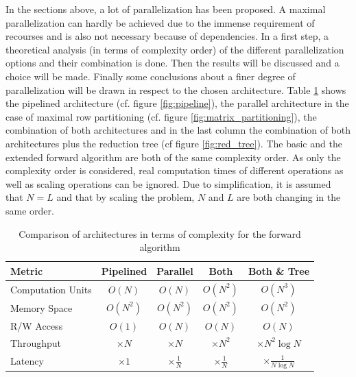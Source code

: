 \documentclass[mscthesis]{usiinfthesis}
\begin{document}
In the sections above, a lot of parallelization has been proposed. A maximal
parallelization can hardly be achieved due to the immense requirement of
recourses and is also not necessary because of dependencies. In a first step,
a theoretical analysis (in terms of complexity order) of the different
parallelization options and their combination is done. Then the results will be
discussed and a choice will be made. Finally some conclusions about a finer
degree of parallelization will be drawn in respect to the chosen architecture.
Table \ref{tab:summary_O} shows the pipelined architecture (cf. figure
\ref{fig:pipeline}), the parallel architecture in the case of maximal row
partitioning (cf. figure \ref{fig:matrix_partitioning}), the combination of
both architectures and in the last column the combination of both architectures
plus the reduction tree (cf figure \ref{fig:red_tree}). The basic and the
extended forward algorithm are both of the same complexity order. As only the
complexity order is considered, real computation times of different operations
as well as scaling operations can be ignored. Due to simplification, it is
assumed that $N=L$ and that by scaling the problem, $N$ and $L$ are both
changing in the same order.

\begin{table}
    \begin{center}
        \begin{tabular}{|l|*{4}{c|}}
            \hline
            Metric & Pipelined & Parallel & Both & Both \& Tree \\
            \hline
            \hline
            Computation Units
            & $O(N)$ & $O(N)$ & $O(N^2)$ & $O(N^3)$ \\
            \hline
            Memory Space
            & $O(N^2)$ & $O(N^2)$ & $O(N^2)$ & $O(N^2)$ \\
            \hline
            R/W Access
            & $O(1)$ & $O(N)$ & $O(N)$ & $O(N)$ \\
            \hline
            \hline
            Throughput
            & $\times N$ & $\times N$ & $\times N^2$ & $\times N^2\log N$ \\
            \hline
            Latency
            & $\times 1$ & $\times \frac{1}{N}$ & $\times \frac{1}{N}$
            & $\times \frac{1}{N\log N}$ \\
            \hline
        \end{tabular}
    \end{center}
    \caption{Comparison of architectures in terms of complexity for the forward
        algorithm}
    \label{tab:summary_O}
\end{table}
\end{document}
